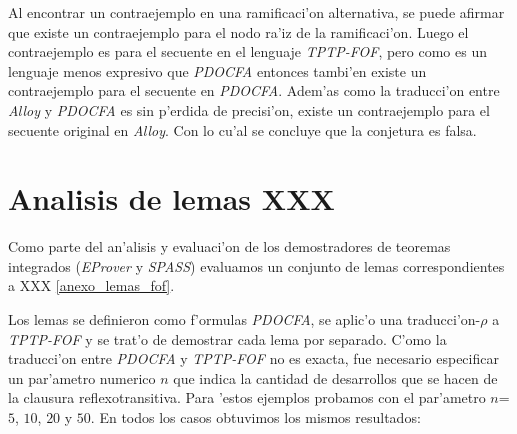 Al encontrar un contraejemplo en una ramificaci'on alternativa, se puede afirmar que existe un contraejemplo para el nodo ra'iz de la ramificaci'on. Luego el contraejemplo es para el secuente en el lenguaje \textit{TPTP-FOF}, pero como es un lenguaje menos expresivo que \textit{PDOCFA} entonces tambi'en existe un contraejemplo para el secuente en \textit{PDOCFA}. Adem'as como la traducci'on entre \textit{Alloy} y \textit{PDOCFA} es sin p'erdida de precisi'on, existe un contraejemplo para el secuente original en \textit{Alloy}. Con lo cu'al se concluye que la conjetura es falsa.


\section{Analisis de lemas XXX}
\label{analisis_lemas}
Como parte del an'alisis y evaluaci'on de los demostradores de teoremas integrados (\textit{EProver} y \textit{SPASS}) evaluamos un conjunto de lemas correspondientes a XXX \ref{anexo_lemas_fof}.

Los lemas se definieron como f'ormulas \textit{PDOCFA}, se aplic'o una traducci'on-$\rho$ a \textit{TPTP-FOF} y se trat'o de demostrar cada lema por separado. C'omo la traducci'on entre \textit{PDOCFA} y \textit{TPTP-FOF} no es exacta, fue necesario especificar un par'ametro numerico $n$ que indica la cantidad de desarrollos que se hacen de la clausura reflexotransitiva. Para 'estos ejemplos probamos con el par'ametro $n$=$5$, $10$, $20$ y $50$. En todos los casos obtuvimos los mismos resultados:

\vspace{1em}

